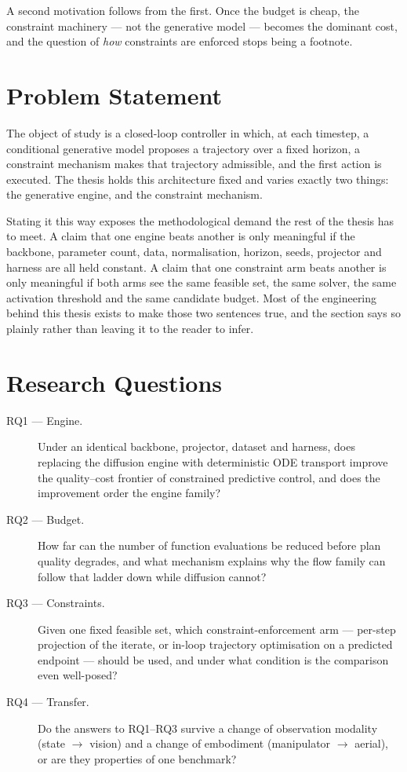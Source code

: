\documentclass[headsepline,footsepline,footinclude=false,oneside,fontsize=11pt,paper=a4,listof=totoc,bibliography=totoc]{scrbook}
\begin{document}
A second motivation follows from the first. Once the budget is cheap, the constraint
machinery --- not the generative model --- becomes the dominant cost, and the question of
\emph{how} constraints are enforced stops being a footnote.

\section{Problem Statement}\label{sec:intro:problem}

The object of study is a closed-loop controller in which, at each timestep, a conditional
generative model proposes a trajectory over a fixed horizon, a constraint mechanism makes
that trajectory admissible, and the first action is executed. The thesis holds this
architecture fixed and varies exactly two things: the generative engine, and the
constraint mechanism.

Stating it this way exposes the methodological demand the rest of the thesis has to meet.
A claim that one engine beats another is only meaningful if the backbone, parameter count,
data, normalisation, horizon, seeds, projector and harness are all held constant. A claim
that one constraint arm beats another is only meaningful if both arms see the same feasible
set, the same solver, the same activation threshold and the same candidate budget. Most of
the engineering behind this thesis exists to make those two sentences true, and the section
says so plainly rather than leaving it to the reader to infer.

\section{Research Questions}\label{sec:intro:rqs}

\begin{description}
  \item[RQ1 --- Engine.] Under an identical backbone, projector, dataset and harness, does
    replacing the diffusion engine with deterministic ODE transport improve the
    quality--cost frontier of constrained predictive control, and does the improvement
    order the engine family?
  \item[RQ2 --- Budget.] How far can the number of function evaluations be reduced before
    plan quality degrades, and what mechanism explains why the flow family can follow that
    ladder down while diffusion cannot?
  \item[RQ3 --- Constraints.] Given one fixed feasible set, which constraint-enforcement
    arm --- per-step projection of the iterate, or in-loop trajectory optimisation on a
    predicted endpoint --- should be used, and under what condition is the comparison even
    well-posed?
  \item[RQ4 --- Transfer.] Do the answers to RQ1--RQ3 survive a change of observation
    modality (state $\rightarrow$ vision) and a change of embodiment (manipulator
    $\rightarrow$ aerial), or are they properties of one benchmark?
\end{description}
\end{document}
